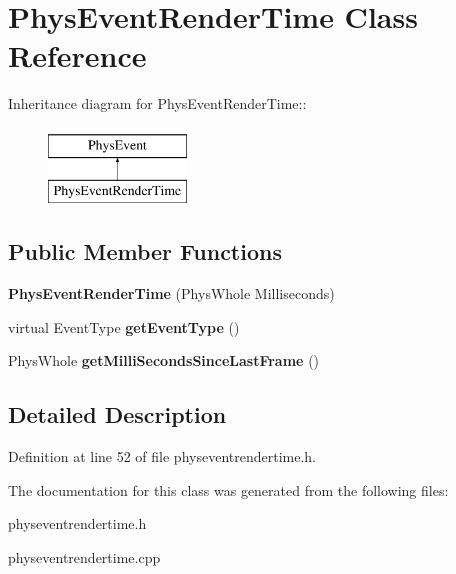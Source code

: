 \hypertarget{classPhysEventRenderTime}{
\section{PhysEventRenderTime Class Reference}
\label{d4/d83/classPhysEventRenderTime}
}
Inheritance diagram for PhysEventRenderTime::\begin{figure}[H]
\begin{center}
\leavevmode
\includegraphics[height=2cm]{d4/d83/classPhysEventRenderTime}
\end{center}
\end{figure}
\subsection*{Public Member Functions}
\begin{DoxyCompactItemize}
\item 
\hypertarget{classPhysEventRenderTime_af6ad859225b0c869af9145844ac5a248}{
{\bfseries PhysEventRenderTime} (PhysWhole Milliseconds)}
\label{d4/d83/classPhysEventRenderTime_af6ad859225b0c869af9145844ac5a248}

\item 
\hypertarget{classPhysEventRenderTime_ac0c4d6e6a547d16579e371a4a5ea8ae1}{
virtual EventType {\bfseries getEventType} ()}
\label{d4/d83/classPhysEventRenderTime_ac0c4d6e6a547d16579e371a4a5ea8ae1}

\item 
\hypertarget{classPhysEventRenderTime_aaba6aa77d58877dc8b3784c1ebcfe7b6}{
PhysWhole {\bfseries getMilliSecondsSinceLastFrame} ()}
\label{d4/d83/classPhysEventRenderTime_aaba6aa77d58877dc8b3784c1ebcfe7b6}

\end{DoxyCompactItemize}


\subsection{Detailed Description}


Definition at line 52 of file physeventrendertime.h.

The documentation for this class was generated from the following files:\begin{DoxyCompactItemize}
\item 
physeventrendertime.h\item 
physeventrendertime.cpp\end{DoxyCompactItemize}
